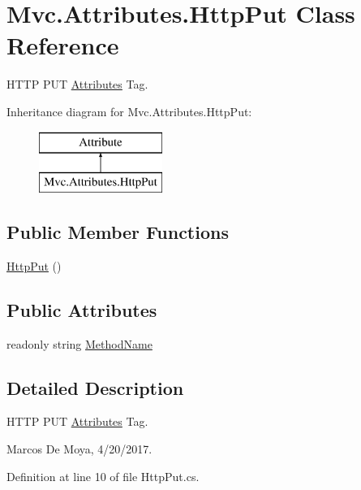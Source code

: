 \hypertarget{class_mvc_1_1_attributes_1_1_http_put}{}\section{Mvc.\+Attributes.\+Http\+Put Class Reference}
\label{class_mvc_1_1_attributes_1_1_http_put}


H\+T\+TP P\+UT \hyperlink{namespace_mvc_1_1_attributes}{Attributes} Tag.  


Inheritance diagram for Mvc.\+Attributes.\+Http\+Put\+:\begin{figure}[H]
\begin{center}
\leavevmode
\includegraphics[height=2.000000cm]{class_mvc_1_1_attributes_1_1_http_put}
\end{center}
\end{figure}
\subsection*{Public Member Functions}
\begin{DoxyCompactItemize}
\item 
\hyperlink{class_mvc_1_1_attributes_1_1_http_put_a262107e29b10590138060ef6de9f2823}{Http\+Put} ()
\end{DoxyCompactItemize}
\subsection*{Public Attributes}
\begin{DoxyCompactItemize}
\item 
readonly string \hyperlink{class_mvc_1_1_attributes_1_1_http_put_ad02aa0515bd2e615805ba3c0f0fcc039}{Method\+Name}
\end{DoxyCompactItemize}


\subsection{Detailed Description}
H\+T\+TP P\+UT \hyperlink{namespace_mvc_1_1_attributes}{Attributes} Tag. 

Marcos De Moya, 4/20/2017. 

Definition at line 10 of file Http\+Put.\+cs.



